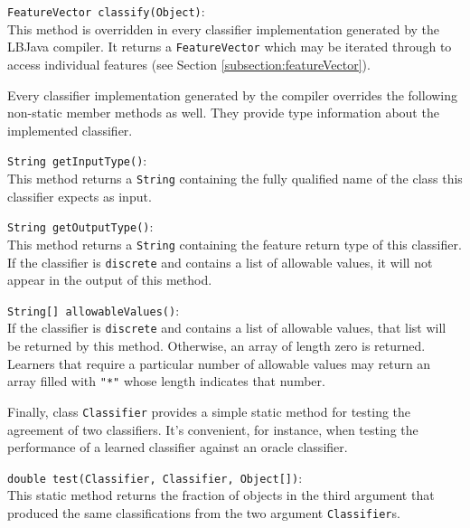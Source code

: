 \begin{list}{}{}
\item[{\tt FeatureVector classify(Object)}:] ~\\
This method is overridden in every classifier implementation generated by the
LBJava compiler.  It returns a {\tt FeatureVector} which may be iterated through
to access individual features (see Section \ref{subsection:featureVector}).
\end{list}

Every classifier implementation generated by the compiler overrides the
following non-static member methods as well.  They provide type information
about the implemented classifier.

\begin{list}{}{}
\item[{\tt String getInputType()}:] ~\\
This method returns a {\tt String} containing the fully qualified name of the
class this classifier expects as input.

\item[{\tt String getOutputType()}:] ~\\
This method returns a {\tt String} containing the feature return type of this
classifier.  If the classifier is {\tt discrete} and contains a list of
allowable values, it will not appear in the output of this method.

\item[{\tt String[] allowableValues()}:] ~\\
If the classifier is {\tt discrete} and contains a list of allowable values,
that list will be returned by this method.  Otherwise, an array of length zero
is returned.  Learners that require a particular number of allowable values
may return an array filled with {\tt "*"} whose length indicates that number.
\end{list}

Finally, class {\tt Classifier} provides a simple static method for testing
the agreement of two classifiers.  It's convenient, for instance, when testing
the performance of a learned classifier against an oracle classifier.

\begin{list}{}{}
\item[{\tt double test(Classifier, Classifier, Object[])}:] ~\\
This static method returns the fraction of objects in the third argument that
produced the same classifications from the two argument {\tt Classifier}s.
\end{list}

